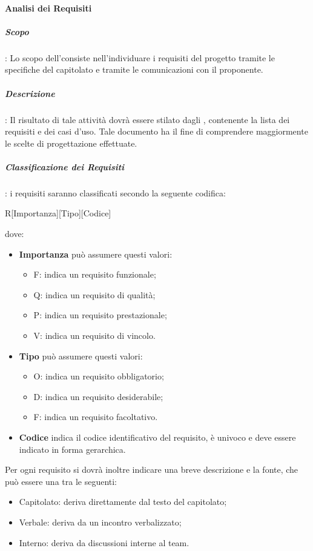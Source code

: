 \paragraph{Analisi dei Requisiti}
\subparagraph{Scopo}:
	Lo scopo dell'\AdR consiste nell'individuare i requisiti del progetto tramite le specifiche del capitolato e tramite le comunicazioni con il proponente. 
\subparagraph{Descrizione}:
	Il risultato di tale attività dovrà essere stilato dagli \anas, contenente la lista dei requisiti e dei casi d'uso. Tale documento ha il fine di comprendere maggiormente le scelte di progettazione effettuate.
\subparagraph{Classificazione dei Requisiti}:
	i requisiti saranno classificati secondo la seguente codifica:
		\begin{center}
			R[Importanza][Tipo][Codice]
		\end{center}
	dove:
	\begin{itemize}
		\item \textbf{Importanza} può assumere questi valori:
			\begin{itemize}
				\item F: indica un requisito funzionale;
				\item Q: indica un requisito di qualità;
				\item P: indica un requisito prestazionale;
				\item V: indica un requisito di vincolo.
			\end{itemize}
		\item \textbf{Tipo} può assumere questi valori:
			\begin{itemize}
				\item O: indica un requisito obbligatorio;
				\item D: indica un requisito desiderabile;
				\item F: indica un requisito facoltativo.
			\end{itemize}
		\item \textbf{Codice} indica il codice identificativo del requisito, è univoco e deve essere indicato in
		forma gerarchica.
	\end{itemize}
	Per ogni requisito si dovrà inoltre indicare una breve descrizione e la fonte, che può essere una tra le seguenti:
		\begin{itemize}
		\item Capitolato: deriva direttamente dal testo del capitolato;
		\item Verbale: deriva da un incontro verbalizzato;
		\item Interno: deriva da discussioni interne al team.
		\end{itemize}
	
